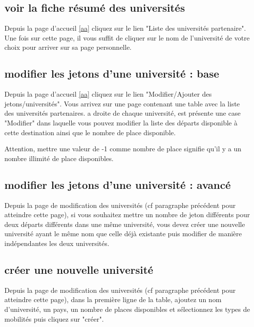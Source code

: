 \subsection{voir la fiche résumé des universités}

Depuis la page d'accueil \ref{aa} cliquez sur le lien "Liste des universités partenaire". Une fois sur cette page, il vous suffit de cliquer sur le nom de l'université de votre choix pour arriver sur sa page personnelle.
 
\subsection{modifier les jetons d'une université : base}

Depuis la page d'accueil \ref{aa} cliquez sur le lien "Modifier/Ajouter des jetons/universités". Vous arrivez sur une page contenant une table avec la liste des universités partenaires. a droite de chaque université, est présente une case "Modifier" dans laquelle vous pouvez modifier la liste des départs disponible à cette destination ainsi que le nombre de place disponible.

\smallbreak

Attention, mettre une valeur de -1 comme nombre de place signifie qu'il y a un nombre illimité de place disponibles.

\subsection{modifier les jetons d'une université : avancé}

Depuis la page de modification des universités (cf paragraphe précédent pour atteindre cette page), si vous souhaitez mettre un nombre de jeton différents pour deux départs différents dans une même université, vous devez créer une nouvelle université ayant le même nom que celle déjà existante puis modifier de manière indépendantes les deux universités.

\subsection{créer une nouvelle université}

Depuis la page de modification des universités (cf paragraphe précédent pour atteindre cette page), dans la première ligne de la table, ajoutez un nom d'université, un pays, un nombre de places disponibles et sélectionnez les types de mobilités puis cliquez sur "créer".

